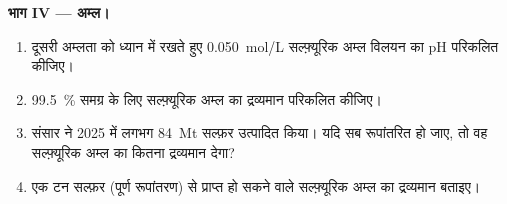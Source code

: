 \begin{problem}
\medskip
\noindent\textbf{भाग IV --- अम्ल।}
\begin{enumerate}[resume]
  \item दूसरी अम्लता को ध्यान में रखते हुए \qty{0.050}{mol/L} सल्फ़्यूरिक अम्ल विलयन का
        pH परिकलित कीजिए।
  \item \qty{99.5}{\percent} समग्र  के लिए सल्फ़्यूरिक अम्ल का
        द्रव्यमान परिकलित कीजिए।
  \item संसार ने 2025 में लगभग \qty{84}{Mt} सल्फ़र उत्पादित किया। यदि सब
        रूपांतरित हो जाए, तो वह सल्फ़्यूरिक अम्ल का कितना द्रव्यमान देगा?
  \item एक टन सल्फ़र (पूर्ण रूपांतरण) से प्राप्त हो सकने वाले सल्फ़्यूरिक अम्ल का द्रव्यमान
        बताइए।
\end{enumerate}
\end{problem}
